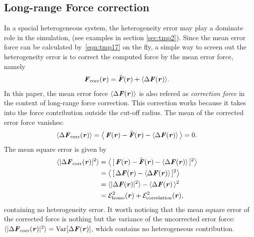 \documentclass[aps,pre,preprint]{revtex4-1}
\renewcommand{\v}[1]{\textbf{\textit{#1}}}
\renewcommand{\d}[1]{\textsf{#1}}
\begin{document}

\subsection{Long-range Force correction}

In a spacial heterogeneous system, the heterogeneity error may play a
dominate role in the simulation, (see examples in section
\ref{sec:tmp2}).  Since the mean error force can be calculated
by~\eqref{eqn:tmp17} on the fly, a simple way to screen out the
heterogeneity error is to correct the computed force by the mean error
force, namely
\begin{align}\label{eqn:define-fcorr}
  \v F_{\textrm{corr}}(\v r) = \tilde{\v F}(\v r) + \langle\Delta\v F(\v r)\rangle.
\end{align}
In this paper, the mean error force $\langle\Delta\v F(\v r)\rangle$
is also refered as \emph{correction force} in the context of
long-range force correction. This correction works because it takes
into the force contribution outside the cut-off radius. The mean of
the corrected error force vanishes:
\begin{align}\label{eqn:mean-fcorr}
  \langle\Delta\v F_{\textrm{corr}}(\v r)\rangle
   =
  \big\langle\,
  \v F(\v r) - \tilde{\v F}(\v r) - \langle\Delta\v F(\v r)\rangle\,
  \big\rangle = 0.
\end{align}
The mean square error is given by
\begin{align} \nonumber
  \langle\vert\Delta\v F_{\textrm{corr}}(\v r)\vert^2\rangle
  & =
  \big\langle\,
  [\,\v F(\v r) - \tilde{\v F}(\v r) - \langle\Delta\v F(\v r)\rangle\,]^2
  \big\rangle \\\nonumber
  & =
  \big\langle\,
  [\,\Delta\v F(\v r) - \langle\Delta\v F(\v r)\rangle\,]^2
  \big\rangle \\\nonumber
  & =
  \langle\vert\Delta\v F(\v r)\vert^2\rangle -
  \langle\Delta\v F(\v r)\,\rangle^2 \\
  & =
  \mathcal E^2_{\textrm{homo}}(\v r) +
  \mathcal E^2_{\textrm{correlation}}(\v r),
\end{align}
containing no heterogeneity error.  It worth noticing that the mean
square error of the corrected force is nothing but the variance of the
uncorrected error force: $\langle\vert\Delta\v F_{\textrm{corr}}(\v
r)\vert^2\rangle = \textrm{Var}[\Delta\v F(\v r)]$, which contains no
heterogeneous contribution.
\end{document}
